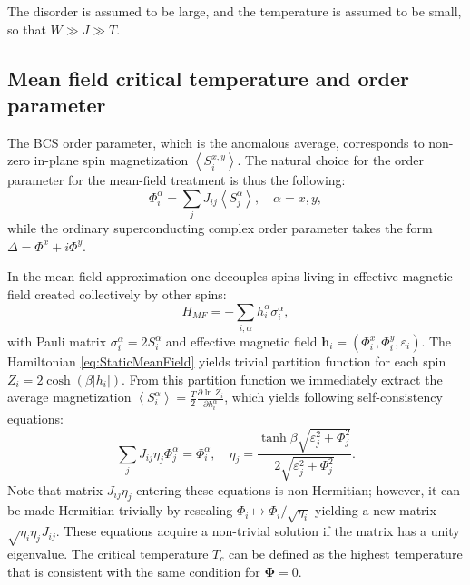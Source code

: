 \documentclass[twocolumn,english,prb]{revtex4-1}
\begin{document}
The disorder is assumed to be large, and the temperature is assumed to be small, so that $W \gg J \gg T$.

\subsection{Mean field critical temperature and order parameter}
\label{sec:MeanFieldStatic}
The BCS order parameter, which is the anomalous average, corresponds to non-zero in-plane spin magnetization $\left\langle S_{i}^{x,y}\right\rangle$. The natural choice for the order parameter for the mean-field treatment is thus the following:
\begin{equation}
\label{eq:OrderParameter}
\Phi_{i}^{\alpha}=\sum_{j}J_{ij}\left\langle S_{j}^{\alpha}\right\rangle,\quad \alpha = x,y,
\end{equation}
while the ordinary superconducting complex order parameter takes the form $\Delta = \Phi^{x} + i \Phi^{y}$.

In the mean-field approximation one decouples spins living in effective magnetic field created collectively by other spins:
\begin{equation}
\label{eq:StaticMeanField} H_{MF}=-\sum_{i,\alpha}h_{i}^{\alpha}\sigma_{i}^{\alpha},
\end{equation}
with Pauli matrix $\sigma_i^\alpha = 2 S_i^\alpha$ and effective magnetic field $\boldsymbol{h}_{i}=(\Phi_{i}^{x},\Phi_{i}^{y},\varepsilon_{i})$. The Hamiltonian \eqref{eq:StaticMeanField} yields trivial partition function for each spin $Z_i=2\cosh(\beta|h_{i}|)$. From this partition function we immediately extract the average magnetization $\left\langle S_{i}^{\alpha}\right\rangle =\frac{T}{2}\frac{\partial\ln Z_{i}}{\partial h_{i}^{\alpha}}$, which yields following self-consistency equations:
\begin{equation}
\sum_{j}J_{ij}\eta_{j}\Phi_{j}^{\alpha}=\Phi_{i}^{\alpha},\quad \eta_j = \frac{\tanh\beta\sqrt{\varepsilon_{j}^{2}+\Phi_{j}^{2}}}{2\sqrt{\varepsilon_{j}^{2}+\Phi_{j}^{2}}}.
\end{equation}
Note that matrix $J_{ij} \eta_j$ entering these equations  is non-Hermitian; however, it can be made Hermitian trivially by rescaling $\Phi_i \mapsto \Phi_i / \sqrt{\eta_i}$ yielding a new matrix $\sqrt{\eta_i \eta_j} J_{ij}$. These equations acquire a non-trivial solution if the matrix has a unity eigenvalue. The critical temperature $T_c$ can be defined as the highest temperature that
is consistent with the same condition for $\boldsymbol{\Phi} = 0$.
\end{document}

